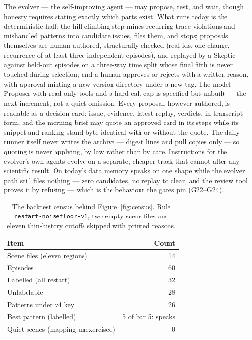 \documentclass[11pt]{article}
\begin{document}
The evolver --- the self-improving agent --- may propose, test, and wait,
though honesty requires stating exactly which parts exist. What runs today is
the deterministic half: the hill-climbing step mines recurring trace
violations and mishandled patterns into candidate issues, files them, and
stops; proposals themselves are human-authored, structurally checked (real
ids, one change, recurrence of at least three independent episodes), and
replayed by a Skeptic against held-out episodes on a three-way time split
whose final fifth is never touched during selection; and a human approves or
rejects with a written reason, with approval minting a new version directory
under a new tag. The model Proposer with read-only tools and a hard call cap
is specified but unbuilt --- the next increment, not a quiet omission. Every
proposal, however authored, is readable as a decision card: issue, evidence,
latest replay, verdicts, in transcript form, and the morning brief may quote
an approved card in its steps while its snippet and ranking stand
byte-identical with or without the quote. The daily runner itself never writes
the archive --- digest lines and pull copies only --- so quoting is never
applying, by law rather than by care. Instructions for the evolver's own
agents evolve on a separate, cheaper track that cannot alter any scientific
result. On today's data memory speaks on one shape while the evolver path
still files nothing --- zero candidates, no replay to clear, and the review
tool proves it by refusing --- which is the behaviour the gates pin (G22--G24).

\begin{table}[t]
\centering
\caption{The backtest census behind Figure~\ref{fig:census}. Rule
\texttt{restart-noisefloor-v1}; two empty scene files and eleven thin-history
cutoffs skipped with printed reasons.}
\label{tab:census}
\begin{tabular}{lr}
\toprule
Item & Count \\
\midrule
Scene files (eleven regions) & 14 \\
Episodes & 60 \\
Labelled (all restart) & 32 \\
Unlabelable & 28 \\
Patterns under v4 key & 26 \\
Best pattern (labelled) & 5 of bar 5: speaks \\
Quiet scenes (mapping unexercised) & 0 \\
\bottomrule
\end{tabular}
\end{table}
\end{document}
